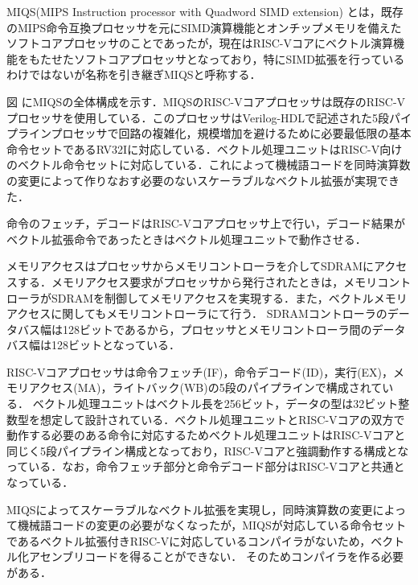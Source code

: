 MIQS(MIPS Instruction processor with Quadword SIMD extension)\cite{bib:hiraishi}
とは，既存のMIPS命令互換プロセッサを元にSIMD演算機能とオンチップメモリを備えたソフトコアプロセッサのことであったが，現在はRISC-Vコアにベクトル演算機能をもたせたソフトコアプロセッサとなっており，特にSIMD拡張を行っているわけではないが名称を引き継ぎMIQSと呼称する．

図%
にMIQSの全体構成を示す．MIQSのRISC-Vコアプロセッサは既存のRISC-Vプロセッサを使用している．このプロセッサはVerilog-HDLで記述された5段パイプラインプロセッサで回路の複雑化，規模増加を避けるために必要最低限の基本命令セットであるRV32Iに対応している．ベクトル処理ユニットはRISC-V向けのベクトル命令セットに対応している．これによって機械語コードを同時演算数の変更によって作りなおす必要のないスケーラブルなベクトル拡張が実現できた．

命令のフェッチ，デコードはRISC-Vコアプロセッサ上で行い，デコード結果がベクトル拡張命令であったときはベクトル処理ユニットで動作させる．

メモリアクセスはプロセッサからメモリコントローラを介してSDRAMにアクセスする．メモリアクセス要求がプロセッサから発行されたときは，メモリコントローラがSDRAMを制御してメモリアクセスを実現する．また，ベクトルメモリアクセスに関してもメモリコントローラにて行う．
SDRAMコントローラのデータバス幅は128ビットであるから，プロセッサとメモリコントローラ間のデータバス幅は128ビットとなっている．

RISC-Vコアプロセッサは命令フェッチ(IF)，命令デコード(ID)，実行(EX)，メモリアクセス(MA)，ライトバック(WB)の5段のパイプラインで構成されている．
ベクトル処理ユニットはベクトル長を256ビット，データの型は32ビット整数型を想定して設計されている．ベクトル処理ユニットとRISC-Vコアの双方で動作する必要のある命令に対応するためベクトル処理ユニットはRISC-Vコアと同じく5段パイプライン構成となっており，RISC-Vコアと強調動作する構成となっている．なお，命令フェッチ部分と命令デコード部分はRISC-Vコアと共通となっている．

MIQSによってスケーラブルなベクトル拡張を実現し，同時演算数の変更によって機械語コードの変更の必要がなくなったが，MIQSが対応している命令セットであるベクトル拡張付きRISC-Vに対応しているコンパイラがないため，ベクトル化アセンブリコードを得ることができない．
そのためコンパイラを作る必要がある．